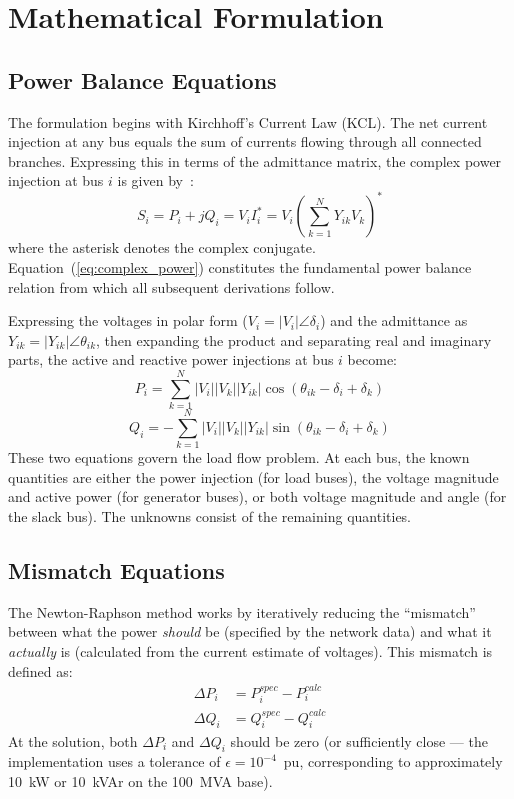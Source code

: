 \documentclass[12pt, a4paper]{article}
\begin{document}
\newpage
\section{Mathematical Formulation}

\subsection{Power Balance Equations}
The formulation begins with Kirchhoff's Current Law (KCL). The net current injection at any bus equals the sum of currents flowing through all connected branches. Expressing this in terms of the admittance matrix, the complex power injection at bus $i$ is given by~\cite{saadat}:
\begin{equation}
S_i = P_i + jQ_i = V_i I_i^* = V_i \left( \sum_{k=1}^{N} Y_{ik} V_k \right)^*
\label{eq:complex_power}
\end{equation}
where the asterisk denotes the complex conjugate. Equation~(\ref{eq:complex_power}) constitutes the fundamental power balance relation from which all subsequent derivations follow.

Expressing the voltages in polar form ($V_i = |V_i| \angle \delta_i$) and the admittance as $Y_{ik} = |Y_{ik}| \angle \theta_{ik}$, then expanding the product and separating real and imaginary parts, the active and reactive power injections at bus $i$ become:
\begin{equation}
P_i = \sum_{k=1}^{N} |V_i| |V_k| |Y_{ik}| \cos(\theta_{ik} - \delta_i + \delta_k)
\label{eq:P_calc}
\end{equation}
\begin{equation}
Q_i = -\sum_{k=1}^{N} |V_i| |V_k| |Y_{ik}| \sin(\theta_{ik} - \delta_i + \delta_k)
\label{eq:Q_calc}
\end{equation}
These two equations govern the load flow problem. At each bus, the known quantities are either the power injection (for load buses), the voltage magnitude and active power (for generator buses), or both voltage magnitude and angle (for the slack bus). The unknowns consist of the remaining quantities.

\subsection{Mismatch Equations}
The Newton-Raphson method works by iteratively reducing the ``mismatch'' between what the power \textit{should} be (specified by the network data) and what it \textit{actually} is (calculated from the current estimate of voltages). This mismatch is defined as:
\begin{align}
\Delta P_i &= P_{i}^{spec} - P_{i}^{calc} \label{eq:dP} \\
\Delta Q_i &= Q_{i}^{spec} - Q_{i}^{calc} \label{eq:dQ}
\end{align}
At the solution, both $\Delta P_i$ and $\Delta Q_i$ should be zero (or sufficiently close --- the implementation uses a tolerance of $\epsilon = 10^{-4}$~pu, corresponding to approximately 10~kW or 10~kVAr on the 100~MVA base).
\end{document}
